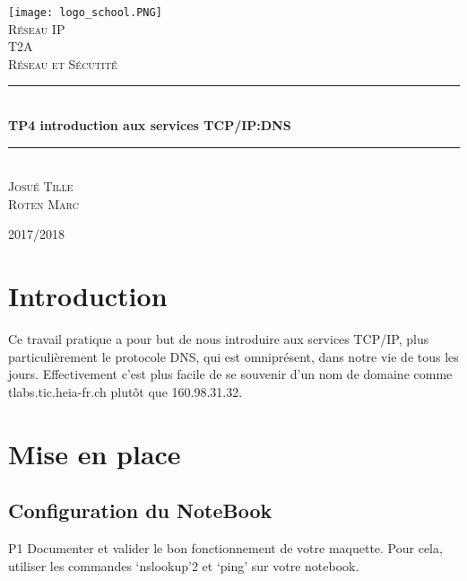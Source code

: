 \documentclass[12pt, openany]{article}
\newcommand{\HRule}{\rule{\linewidth}{0.5mm}}
\begin{document}
\begin{titlepage}
  \begin{sffamily}
  \begin{center}

    \texttt{[image: logo\_school.PNG]}~\\[1.5cm]
    \textsc{\LARGE Réseau IP}\\[2cm]
    \textsc{\Large T2A}\\[1cm]
    \textsc{\Large Réseau et Sécutité}\\[1cm]
  
    \HRule \\[0.4cm] 
    { \huge \bfseries TP4 introduction aux services TCP/IP:DNS\\[0.4cm] }
    \HRule \\[4cm]
    \textsc{\Large Josué Tille}\\[1cm]
    \textsc{\Large Roten Marc}\\[1cm]
    \vfill

    {\large  2017/2018}

  \end{center}
  \end{sffamily}
\end{titlepage}
\tableofcontents
\newpage
\section{Introduction}

Ce travail pratique a pour but de nous introduire aux services TCP/IP, plus particulièrement le protocole DNS, qui est omniprésent, dans notre vie de tous les jours. Effectivement c'est plus facile de se souvenir d'un nom de domaine comme tlabs.tic.heia-fr.ch plutôt que 160.98.31.32.

\section{Mise en place}
\subsection{Configuration du NoteBook}
P1	Documenter et valider le bon fonctionnement de votre maquette. Pour cela, utiliser les commandes ‘nslookup’2 et ‘ping’ sur votre notebook.
\end{document}

